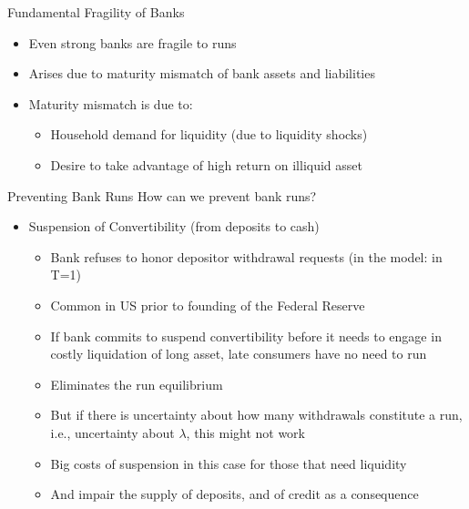 \documentclass[11pt,aspectratio=169,xcolor={dvipsnames},hyperref={pdftex,pdfpagemode=UseNone,hidelinks,pdfdisplaydoctitle=true},usepdftitle=false]{beamer}
\begin{document}
\begin{frame}{Fundamental Fragility of Banks}
\begin{itemize}
	\itemsep1em 
	\item Even strong banks are fragile to runs
	\item Arises due to maturity mismatch of bank assets and liabilities
	\item Maturity mismatch is due to:
	\begin{itemize}
		\item Household demand for liquidity (due to liquidity shocks)
		\item Desire to take advantage of high return on illiquid asset
	\end{itemize}
\end{itemize}
\end{frame}




\begin{frame}{Preventing Bank Runs}
How can we prevent bank runs? \pause 
\begin{itemize}
	\item Suspension of Convertibility (from deposits to cash)
	\begin{itemize}
		\item Bank refuses to honor depositor withdrawal requests (in the model: in T=1)
		\item Common in US prior to founding of the Federal Reserve
		\item If bank commits to suspend convertibility before it needs to engage in costly liquidation of long asset, late consumers have no need to run
		\item Eliminates the run equilibrium
		\item But if there is uncertainty about how many withdrawals constitute a run, i.e., uncertainty about $\lambda$, this might not work
		\item Big costs of suspension in this case for those that need liquidity
		\item And impair the supply of deposits, and of credit as a consequence
	\end{itemize}
\end{itemize}
\end{frame}
\end{document}
